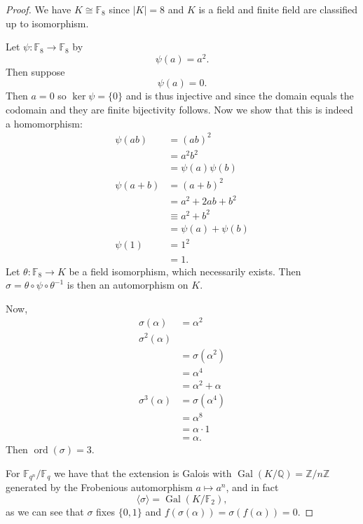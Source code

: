 \begin{proof}
    We have $K \cong \mathbb F_8$ since $|K| = 8$ and 
    $K$ is a field and finite field are classified 
    up to isomorphism. 

    Let $\psi : \mathbb F_8 \to \mathbb F_8$ by 
    \[
        \psi(a) = a^2. 
    \]
    Then suppose 
    \[
        \psi(a) = 0. 
    \]
    Then $a = 0$ so $\ker \psi = \{0\}$ and 
    is thus injective and since the domain 
    equals the codomain and they are finite bijectivity 
    follows. Now we show that this is indeed a homomorphism: 
    \begin{align*}
        \psi(ab) &= (ab)^2 \\ 
                 &= a^2b^2 \\ 
                 &= \psi(a)\psi(b) \\ 
        \psi(a+b)&= (a+b)^2 \\ 
                 &= a^2 + 2ab + b^2 \\ 
                 &\equiv a^2 + b^2 \\ 
                 &= \psi(a) + \psi(b) \\
        \psi(1)  &= 1^2 \\  &= 1.
    \end{align*}
    Let $\theta : \mathbb F_8 \to K$ be a field isomorphism, which 
    necessarily exists.
    Then $\sigma = \theta \circ \psi \circ \theta^{-1}$ is then 
    an automorphism on $K$.

    Now, 
    \begin{align*}
        \sigma(\alpha) 
        &= \alpha^2 \\ 
        \sigma^2(\alpha) \\ 
        &= \sigma(\alpha^2) \\ 
        &= \alpha^4 \\ 
        &= \alpha^2 + \alpha \\ 
        \sigma^3(\alpha) 
        &= \sigma(\alpha^4) \\ 
        &= \alpha^8 \\ 
        &= \alpha \cdot 1 \\ 
        &= \alpha. 
    \end{align*}
    Then $\operatorname{ord}(\sigma) = 3$. 

    For $\mathbb F_{q^n} / \mathbb F_q$ we have 
    that the extension is Galois with 
    $\operatorname{Gal}(K/\mathbb Q) = \mathbb Z/n\mathbb Z$ 
    generated by the Frobenious automorphism 
    $a \mapsto a^n$, and in fact 
    \[
        \langle \sigma \rangle = 
        \operatorname{Gal}(K/\mathbb F_2), 
    \]
    as we can see that $\sigma$ fixes $\{0,1\}$ and 
    $f(\sigma(\alpha)) = \sigma(f(\alpha)) = 0$. 
\end{proof}

